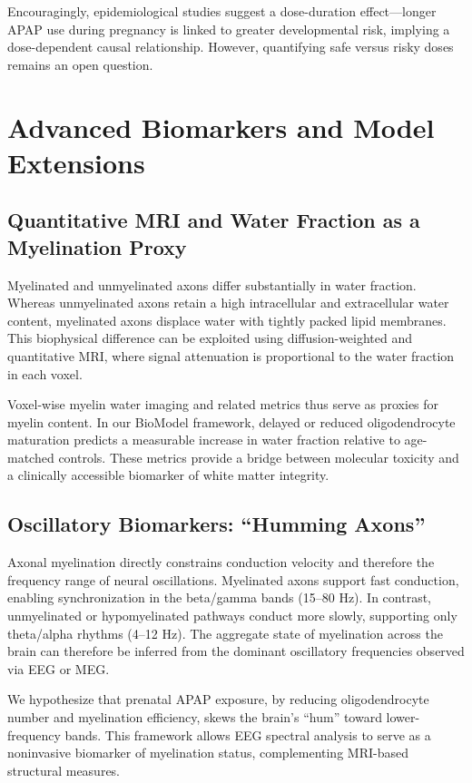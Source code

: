 \documentclass[11pt]{article}
\let\oldsection\section
\renewcommand{\section}[1]{\oldsection{#1}\setlength{\leftskip}{0em}}
\let\oldsubsection\subsection
\renewcommand{\subsection}[1]{\oldsubsection{#1}\setlength{\leftskip}{0.75em}}
\begin{document}
Encouragingly, epidemiological studies suggest a dose-duration effect—longer APAP use during pregnancy is linked to greater developmental risk, implying a dose-dependent causal relationship. However, quantifying safe versus risky doses remains an open question.

\section{Advanced Biomarkers and Model Extensions}

\subsection{Quantitative MRI and Water Fraction as a Myelination Proxy}

Myelinated and unmyelinated axons differ substantially in water fraction. Whereas unmyelinated axons retain a high intracellular and extracellular water content, myelinated axons displace water with tightly packed lipid membranes. This biophysical difference can be exploited using diffusion-weighted and quantitative MRI, where signal attenuation is proportional to the water fraction in each voxel.

Voxel-wise myelin water imaging and related metrics thus serve as proxies for myelin content. In our BioModel framework, delayed or reduced oligodendrocyte maturation predicts a measurable increase in water fraction relative to age-matched controls. These metrics provide a bridge between molecular toxicity and a clinically accessible biomarker of white matter integrity.

\subsection{Oscillatory Biomarkers: ``Humming Axons''}

Axonal myelination directly constrains conduction velocity and therefore the frequency range of neural oscillations. Myelinated axons support fast conduction, enabling synchronization in the beta/gamma bands (15--80 Hz). In contrast, unmyelinated or hypomyelinated pathways conduct more slowly, supporting only theta/alpha rhythms (4--12 Hz). The aggregate state of myelination across the brain can therefore be inferred from the dominant oscillatory frequencies observed via EEG or MEG.

We hypothesize that prenatal APAP exposure, by reducing oligodendrocyte number and myelination efficiency, skews the brain's ``hum'' toward lower-frequency bands. This framework allows EEG spectral analysis to serve as a noninvasive biomarker of myelination status, complementing MRI-based structural measures.
\end{document}
